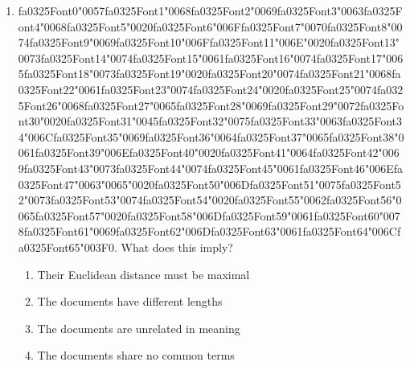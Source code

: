 \documentclass[12pt]{article}
\begin{document}
\begin{enumerate}[label=Q\arabic*.]
 \item {\csname fa0325Font0\endcsname\char"0057}{\csname fa0325Font1\endcsname\char"0068}{\csname fa0325Font2\endcsname\char"0069}{\csname fa0325Font3\endcsname\char"0063}{\csname fa0325Font4\endcsname\char"0068}{\csname fa0325Font5\endcsname\char"0020}{\csname fa0325Font6\endcsname\char"006F}{\csname fa0325Font7\endcsname\char"0070}{\csname fa0325Font8\endcsname\char"0074}{\csname fa0325Font9\endcsname\char"0069}{\csname fa0325Font10\endcsname\char"006F}{\csname fa0325Font11\endcsname\char"006E}{\char"0020}{\csname fa0325Font13\endcsname\char"0073}{\csname fa0325Font14\endcsname\char"0074}{\csname fa0325Font15\endcsname\char"0061}{\csname fa0325Font16\endcsname\char"0074}{\csname fa0325Font17\endcsname\char"0065}{\csname fa0325Font18\endcsname\char"0073}{\csname fa0325Font19\endcsname\char"0020}{\csname fa0325Font20\endcsname\char"0074}{\csname fa0325Font21\endcsname\char"0068}{\csname fa0325Font22\endcsname\char"0061}{\csname fa0325Font23\endcsname\char"0074}{\csname fa0325Font24\endcsname\char"0020}{\csname fa0325Font25\endcsname\char"0074}{\csname fa0325Font26\endcsname\char"0068}{\csname fa0325Font27\endcsname\char"0065}{\csname fa0325Font28\endcsname\char"0069}{\csname fa0325Font29\endcsname\char"0072}{\csname fa0325Font30\endcsname\char"0020}{\csname fa0325Font31\endcsname\char"0045}{\csname fa0325Font32\endcsname\char"0075}{\csname fa0325Font33\endcsname\char"0063}{\csname fa0325Font34\endcsname\char"006C}{\csname fa0325Font35\endcsname\char"0069}{\csname fa0325Font36\endcsname\char"0064}{\csname fa0325Font37\endcsname\char"0065}{\csname fa0325Font38\endcsname\char"0061}{\csname fa0325Font39\endcsname\char"006E}{\csname fa0325Font40\endcsname\char"0020}{\csname fa0325Font41\endcsname\char"0064}{\csname fa0325Font42\endcsname\char"0069}{\csname fa0325Font43\endcsname\char"0073}{\csname fa0325Font44\endcsname\char"0074}{\csname fa0325Font45\endcsname\char"0061}{\csname fa0325Font46\endcsname\char"006E}{\csname fa0325Font47\endcsname\char"0063}{\char"0065}{\char"0020}{\csname fa0325Font50\endcsname\char"006D}{\csname fa0325Font51\endcsname\char"0075}{\csname fa0325Font52\endcsname\char"0073}{\csname fa0325Font53\endcsname\char"0074}{\csname fa0325Font54\endcsname\char"0020}{\csname fa0325Font55\endcsname\char"0062}{\csname fa0325Font56\endcsname\char"0065}{\csname fa0325Font57\endcsname\char"0020}{\csname fa0325Font58\endcsname\char"006D}{\csname fa0325Font59\endcsname\char"0061}{\csname fa0325Font60\endcsname\char"0078}{\csname fa0325Font61\endcsname\char"0069}{\csname fa0325Font62\endcsname\char"006D}{\csname fa0325Font63\endcsname\char"0061}{\csname fa0325Font64\endcsname\char"006C}{\csname fa0325Font65\endcsname\char"003F}$0$. What does this imply?
 \begin{enumerate}[label=(\Alph*)]
     \item Their Euclidean distance must be maximal
     \item The documents have different lengths
     \item The documents are unrelated in meaning
     \item The documents share no common terms
 \end{enumerate}
 

\end{enumerate}
\end{document}
